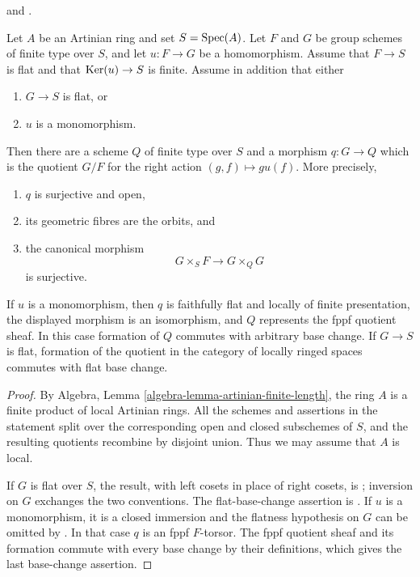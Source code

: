 \begin{proposition}
\label{proposition-artinian-group-action-quotient}
\begin{reference}
\cite[Expos\'e 212, Th\'eor\`eme 7.2, p. 115]{FGA} and
\cite[Expos\'e VI$_A$, Th\'eor\`emes 3.2 and 3.3.2, and 4.7]{SGA3}.
\end{reference}
Let $A$ be an Artinian ring and set $S = \mathop{\mathrm{Spec}}(A)$. Let $F$ and $G$
be group schemes of finite type over $S$, and let $u : F \to G$ be a
homomorphism. Assume that $F \to S$ is flat and that $\mathop{\mathrm{Ker}}(u) \to S$
is finite. Assume in addition that either
\begin{enumerate}
\item $G \to S$ is flat, or
\item $u$ is a monomorphism.
\end{enumerate}
Then there are a scheme $Q$ of finite type over $S$ and a morphism
$q : G \to Q$ which is the quotient $G/F$ for the right action
$(g, f) \mapsto gu(f)$. More precisely,
\begin{enumerate}
\item $q$ is surjective and open,
\item its geometric fibres are the orbits, and
\item the canonical morphism
$$
G \times_S F \longrightarrow G \times_Q G
$$
is surjective.
\end{enumerate}
If $u$ is a monomorphism, then $q$ is faithfully flat and locally of
finite presentation, the displayed morphism is an isomorphism, and
$Q$ represents the fppf quotient sheaf. In this case formation of $Q$
commutes with arbitrary base change. If $G \to S$ is flat, formation
of the quotient in the category of locally ringed spaces commutes with
flat base change.
\end{proposition}

\begin{proof}
By Algebra, Lemma \ref{algebra-lemma-artinian-finite-length}, the ring
$A$ is a finite product of local Artinian rings. All the schemes and
assertions in the statement split over the corresponding open and closed
subschemes of $S$, and the resulting quotients recombine by disjoint union.
Thus we may assume that $A$ is local.

If $G$ is flat over $S$, the result, with left cosets in place of right
cosets, is \cite[Expos\'e VI$_A$, Th\'eor\`eme 3.2]{SGA3}; inversion on
$G$ exchanges the two conventions. The flat-base-change assertion is
\cite[Expos\'e VI$_A$, 4.7]{SGA3}. If $u$ is a monomorphism, it is a
closed immersion and the flatness hypothesis on $G$ can be omitted by
\cite[Expos\'e VI$_A$, Th\'eor\`eme 3.3.2]{SGA3}. In that case $q$ is
an fppf $F$-torsor. The fppf quotient sheaf and its formation commute
with every base change by their definitions, which gives the last
base-change assertion.
\end{proof}

